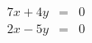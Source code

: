 \documentclass[a4paper,10pt,fleqn]{article}
\begin{document}
   \begin{eqnarray}
   7x + 4y & =  & 0 \\
   2x - 5y & =  & 0
    \end{eqnarray}
\end{document}
